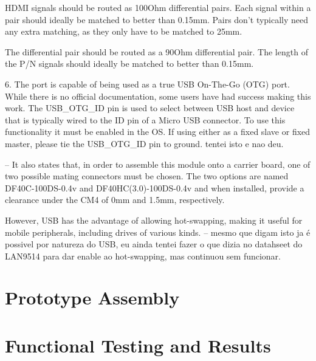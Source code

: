     HDMI signals should be routed as 100Ohm differential pairs. Each signal within a pair should ideally be matched to better than 0.15mm. Pairs don't typically need any extra matching, as they only have to be matched to 25mm.

    The differential pair should be routed as a 90Ohm differential pair. The length of the P/N signals should ideally be matched to better than 0.15mm.

    6. The port is capable of being used as a true USB On-The-Go (OTG) port. While there is no official documentation, some users have had success making this work. The USB\_OTG\_ID pin is used to select between USB host and device that is typically wired to the ID pin of a Micro USB connector. To use this functionality it must be enabled in the OS. If using either as a fixed slave or fixed master, please tie the USB\_OTG\_ID pin to ground. tentei isto e nao deu.

	-- It also states that, in order to assemble this module onto a carrier board, one of two possible mating connectors must be chosen. The two options are named DF40C-100DS-0.4v and DF40HC(3.0)-100DS-0.4v and when installed, provide a clearance under the CM4 of 0mm and 1.5mm, respectively. 

    However, USB has the advantage of allowing hot-swapping, making it useful for mobile peripherals, including drives of various kinds. -- mesmo que digam isto ja é possivel por natureza do USB, eu ainda tentei fazer o que dizia no datahseet do LAN9514 para dar enable ao hot-swapping, mas continuou sem funcionar.

\section{Prototype Assembly}\label{sec:53_PrototypeAssembly}

\section{Functional Testing and Results}\label{sec:54_FunctionalTesting}